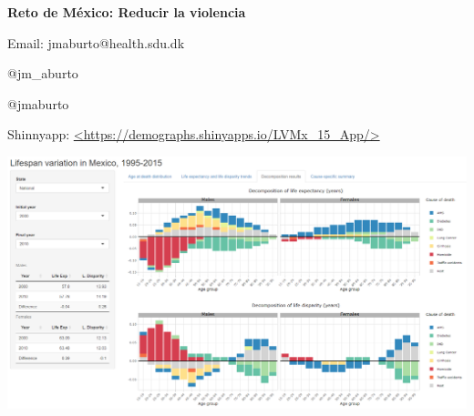 \documentclass[xcolor={dvipsnames}]{beamer}
\begin{document}
\begin{frame}
 \begin{center}
	\begin{center}
	 \textbf{Reto de M\'exico: Reducir la violencia}
	\end{center}

	\bigskip

Email: jmaburto@health.sdu.dk 

\faTwitter \quad  @jm\_aburto 

\faGithub \quad @jmaburto 

Shinnyapp: \url{<https://demographs.shinyapps.io/LVMx_15_App/>}


\includegraphics[scale=0.23]{Figures/Shinnyapp_fig} \\   

 

\end{center}
 
 

\end{frame}
\end{document}
